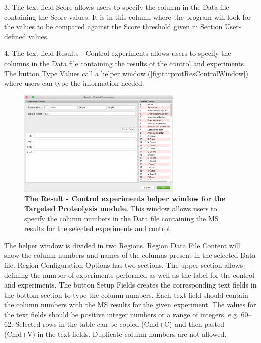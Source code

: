 \num{3}. The text field Score allows users to specify the column in the Data file
containing the Score values. It is in this column where the program will look for
the values to be compared against the Score threshold given in Section User-defined
values.

\num{4}. \label{par:limprotResultControl}The text field Results - Control experiments
allows users to specify the columns in the Data file containing the results of the
control and experiments. The button Type Values call a helper window
(\autoref{fig:tarprotResControlWindow}) where users can type the information needed. 

\begin{figure}[h]
    \centering
    \includegraphics[width=0.7\textwidth]{./IMAGES/MOD-TARPROT/tarprot-rescontrol.jpg}
    \caption[The Result - Control experiments helper window for the Targeted Proteolysis module]{\textbf{The Result - Control experiments helper window for the Targeted Proteolysis module.} This window allows users to specify the column numbers in the Data file containing the MS results for the selected experiments and control.} 
    \label{fig:tarprotResControlWindow}
    \vspace{-5pt} 	
\end{figure}

The helper window is divided in two Regions. Region Data File Content will show the 
column numbers and names of the columns present in the selected Data file. Region
Configuration Options has two sections. The upper section allows defining the number
of experiments performed as well as the label for the control and experiments. The
button Setup Fields creates the corresponding text fields in the bottom section to
type the column numbers. Each text field should contain the column numbers with the
MS results for the given experiment. The values for the text fields should be positive
integer numbers or a range of integers, e.g. \numrange[range-phrase=--]{60}{62}.
Selected rows in the table can be copied (Cmd+C) and then pasted (Cmd+V) in the text
fields. Duplicate column numbers are not allowed.

